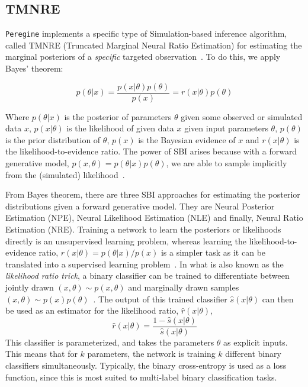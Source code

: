\subsection{TMNRE}
\label{sec:tmnre}

\texttt{Peregine} implements a specific type of Simulation-based inference algorithm, called TMNRE (Truncated Marginal Neural Ratio Estimation) for estimating the marginal posteriors of a \textit{specific} targeted observation~\cite{Miller_TMNRE_2021}. To do this, we apply Bayes' theorem:

\begin{equation*}
    p(\theta|x) = \frac{p(x|\theta) p(\theta)}{p(x)} = r(x|\theta) p(\theta)
\end{equation*}

Where $p(\theta|x)$ is the posterior of parameters $\theta$ given some observed or simulated data $x$, $p(x|\theta)$ is the likelihood of given data $x$ given input parameters $\theta$, $p(\theta)$ is the prior distribution of $\theta$, $p(x)$ is the Bayesian evidence of $x$ and $r(x|\theta)$ is the likelihood-to-evidence ratio. The power of SBI arises because with a forward generative model, $p(x,\theta)=p(\theta|x) p(\theta)$, we are able to sample implicitly from the (simulated) likelihood~\cite{Cranmer_SBI_2020}.

From Bayes theorem, there are three SBI approaches for estimating the posterior distributions given a forward generative model. They are Neural Posterior Estimation (NPE), Neural Likelihood Estimation (NLE) and finally, Neural Ratio Estimation (NRE). Training a network to learn the posteriors or likelihoods directly is an unsupervised learning problem, whereas learning the likelihood-to-evidence ratio, $r(x|\theta) = p(\theta|x) / p(x)$ is a simpler task as it can be translated into a supervised learning problem~\cite{Cranmer_SBI_2020}. In what is also known as the \textit{likelihood ratio trick}, a binary classifier can be trained to differentiate between jointly drawn $(x,\theta) \sim p(x,\theta)$ and marginally drawn samples $(x,\theta) \sim p(x)p(\theta)$~\cite{Brehmer_Cranmer_2020}. The output of this trained classifier $\hat{s}(x|\theta)$ can then be used as an estimator for the likelihood ratio, $\hat{r}(x|\theta)$,
\begin{equation*}
    \hat{r}(x|\theta) = \frac{1-\hat{s}(x|\theta)}{\hat{s}(x|\theta)}
\end{equation*}
This classifier is parameterized, and takes the parameters $\theta$ as explicit inputs. This means that for $k$ parameters, the network is training $k$ different binary classifiers simultaneously. Typically, the binary cross-entropy is used as a loss function, since this is most suited to multi-label binary classification tasks.

